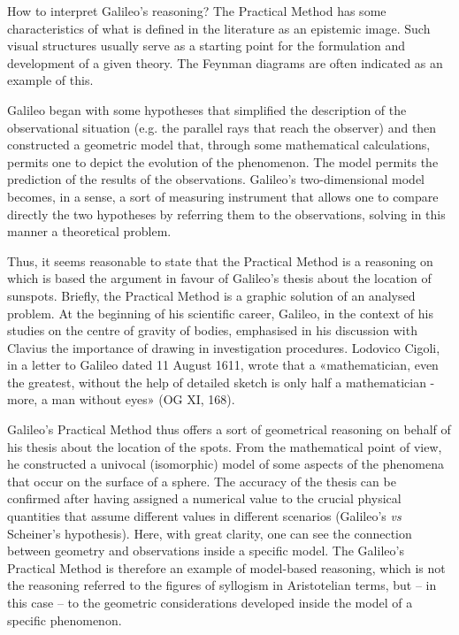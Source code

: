 \begin{artengenv}
How to interpret Galileo’s reasoning? The Practical Method has some characteristics of what is defined in the literature
as an epistemic image. Such visual structures usually serve as a starting point for the formulation and development of
a given theory. The Feynman diagrams are often indicated as an example of this.

Galileo began with some hypotheses that simplified the description of the observational situation (e.g. the parallel
rays that reach the observer) and then constructed a geometric model that, through some mathematical calculations,
permits one to depict the evolution of the phenomenon. The model permits the prediction of the results of the
observations. Galileo’s two-dimensional model becomes, in a sense, a sort of measuring instrument that allows one to
compare directly the two hypotheses by referring them to the observations, solving in this manner a theoretical
problem. 

Thus, it seems reasonable to state that the Practical Method is a reasoning on which is based the argument in favour of
Galileo’s thesis about the location of sunspots. Briefly, the Practical Method is a graphic solution of an analysed
problem. At the beginning of his scientific career, Galileo, in the context of his studies on the centre of gravity of
bodies, emphasised in his discussion with Clavius the importance of drawing in investigation procedures. Lodovico
Cigoli, in a letter to Galileo dated 11 August 1611, wrote that a «mathematician, even the greatest, without the help
of detailed sketch is only half a mathematician - more, a man without eyes» (OG XI, 168).

Galileo’s Practical Method thus offers a sort of geometrical reasoning on behalf of his thesis about the location of the
spots. From the mathematical point of view, he constructed a univocal (isomorphic) model of some aspects of the
phenomena that occur on the surface of a sphere. The accuracy of the thesis can be confirmed after having assigned a
numerical value to the crucial physical quantities that assume different values in different scenarios (Galileo’s
\textit{vs} Scheiner’s hypothesis). Here, with great clarity, one can see the connection between geometry and
observations inside a specific model. The Galileo’s Practical Method is therefore an example of model-based reasoning,
which is not the reasoning referred to the figures of syllogism in Aristotelian terms, but -- in this case -- to the
geometric considerations developed inside the model of a specific phenomenon. 


\end{artengenv}
